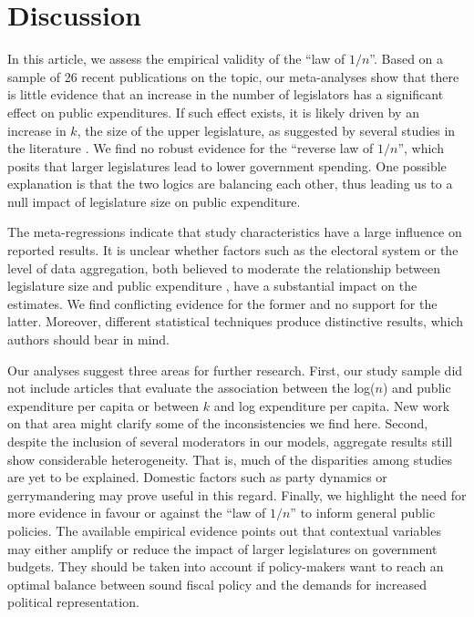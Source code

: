 \documentclass[a4paper,12pt]{article}
\begin{document}
\section{Discussion}
\label{sec:discussion}

In this article, we assess the empirical validity of the ``law of $1/n$''. Based
on a sample of 26 recent publications on the topic, our meta-analyses show that
there is little evidence that an increase in the number of legislators has a
significant effect on public expenditures. If such effect exists, it is likely
driven by an increase in $k$, the size of the upper legislature, as suggested by
several studies in the literature \citep[e.g.,][]{baqir2002districting, 
bradbury2001legislative, bradbury2003local, chen_malhotra_2007,
gilligan2001fiscal, primo2006stop}. We find no robust evidence for the ``reverse
law of $1/n$'', which posits that larger legislatures lead to lower government
spending. One possible explanation is that the two logics are balancing each
other, thus leading us to a null impact of legislature size on public
expenditure.

The meta-regressions indicate that study characteristics have a large influence
on reported results. It is unclear whether factors such as the electoral system
or the level of data aggregation, both believed to moderate the relationship
between legislature size and public expenditure \citep{primo2008distributive,
baqir2002districting, bradbury2003local}, have a substantial impact on the
estimates. We find conflicting evidence for the former and no support for the
latter. Moreover, different statistical techniques produce distinctive results,
which authors should bear in mind.

Our analyses suggest three areas for further research. First, our study sample
did not include articles that evaluate the association between the log($n$) and
public expenditure per capita or between $k$ and log expenditure per capita.
New work on that area might clarify some of the inconsistencies we find
here. Second, despite the inclusion of several moderators in our models,
aggregate results still show considerable heterogeneity. That is, much of the
disparities among studies are yet to be explained. Domestic factors such as
party dynamics or gerrymandering \citep{lee2015supermajority,
mukherjee2003politicalparties, gilligan2006public} may prove useful in this
regard. Finally, we highlight the need for more evidence in favour or against
the ``law of $1/n$'' to inform general public policies. The available empirical
evidence points out that contextual variables may either amplify or reduce the
impact of larger legislatures on government budgets. They should be taken into
account if policy-makers want to reach an optimal balance between sound fiscal
policy and the demands for increased political representation.
\end{document}
